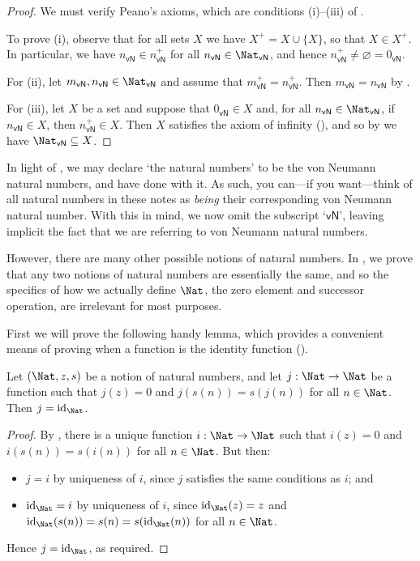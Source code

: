 \begin{proof}
We must verify Peano's axioms, which are conditions (i)--(iii) of .

To prove (i), observe that for all sets $X$ we have $X^+ = X \cup \{ X \}$, so that $X \in X^+$. In particular, we have $n_{\mathsf{vN}} \in n_{\mathsf{vN}}^+$ for all $n_{\mathsf{vN}} \in \Nat_{\mathsf{vN}}$, and hence $n_{\mathsf{vN}}^+ \ne \varnothing = 0_{\mathsf{vN}}$.

For (ii), let $m_{\mathsf{vN}}, n_{\mathsf{vN}} \in \Nat_{\mathsf{vN}}$ and assume that $m_{\mathsf{vN}}^+ = n_{\mathsf{vN}}^+$. Then $m_{\mathsf{vN}} = n_{\mathsf{vN}}$ by .

For (iii), let $X$ be a set and suppose that $0_{\mathsf{vN}} \in X$ and, for all $n_{\mathsf{vN}} \in \Nat_{\mathsf{vN}}$, if $n_{\mathsf{vN}} \in X$, then $n_{\mathsf{vN}}^+ \in X$. Then $X$ satisfies the axiom of infinity (), and so by  we have $\Nat_{\mathsf{vN}} \subseteq X$.
\end{proof}

In light of , we may declare `the natural numbers' to be the von Neumann natural numbers, and have done with it. As such, you can---if you want---think of all natural numbers in these notes as \textit{being} their corresponding von Neumann natural number. With this in mind, we now omit the subscript `$\mathsf{vN}$', leaving implicit the fact that we are referring to von Neumann natural numbers.

However, there are many other possible notions of natural numbers. In , we prove that any two notions of natural numbers are essentially the same, and so the specifics of how we actually define $\Nat$, the zero element and successor operation, are irrelevant for most purposes.

First we will prove the following handy lemma, which provides a convenient means of proving when a function is the identity function ().

\begin{lemma}
\label{lemIdentityFromNNN}
Let $(\mathbb{\Nat}, z, s)$ be a notion of natural numbers, and let $j : \Nat \to \Nat$ be a function such that $j(z) = 0$ and $j(s(n)) = s(j(n))$ for all $n \in \Nat$. Then $j = \mathrm{id}_{\Nat}$.
\end{lemma}

\begin{proof}
By , there is a unique function $i : \Nat \to \Nat$ such that $i(z)=0$ and $i(s(n)) = s(i(n))$ for all $n \in \Nat$. But then:
\begin{itemize}
\item $j = i$ by uniqueness of $i$, since $j$ satisfies the same conditions as $i$; and
\item $\mathrm{id}_\Nat = i$ by uniqueness of $i$, since $\mathrm{id}_\Nat(z) = z$ and $\mathrm{id}_\Nat(s(n)) = s(n) = s(\mathrm{id}_\Nat(n))$ for all $n \in \Nat$.
\end{itemize}
Hence $j = \mathrm{id}_\Nat$, as required.
\end{proof}

